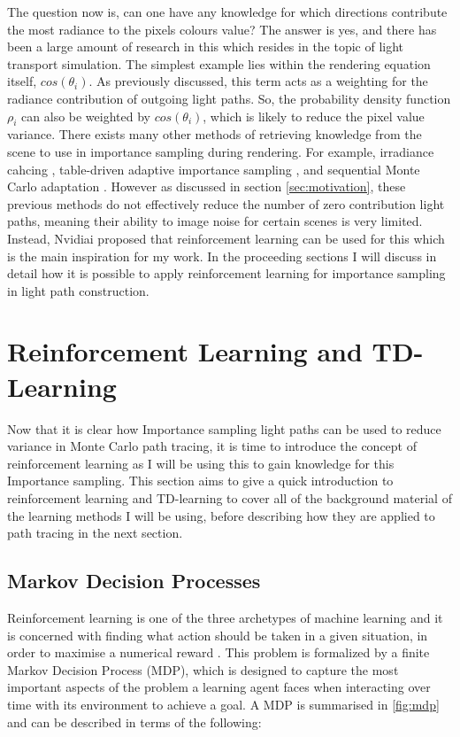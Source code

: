 \documentclass[ %
                    author={Callum Pearce},
                supervisor={Dr. Neill Campbell},
                    degree={MEng},
                     title={How effective are Temporal difference learning methods for reducing the number of zero contribution light paths, while still accurately approximating Global Illumination in Path tracing?},
                  subtitle={},
                      type={research},
                      year={2019} ]{dissertation}
\begin{document}
The question now is, can one have any knowledge for which directions contribute the most radiance to the pixels colours value? The answer is yes, and there has been a large amount of research in this which resides in the topic of light transport simulation. The simplest example lies within the rendering equation itself, $cos(\theta_i)$. As previously discussed, this term acts as a weighting for the radiance contribution of outgoing light paths. So, the probability density function $\rho_i$ can also be weighted by $cos(\theta_i)$, which is likely to reduce the pixel value variance. There exists many other methods of retrieving knowledge from the scene to use in importance sampling during rendering. For example, irradiance cahcing \cite{bashford2012significance}, table-driven adaptive importance sampling \cite{cline2008table}, and sequential Monte Carlo adaptation \cite{pegoraro2008towards}. However as discussed in section \ref{sec:motivation}, these previous methods do not effectively reduce the number of zero contribution light paths, meaning their ability to image noise for certain scenes is very limited. Instead, Nvidiai proposed that reinforcement learning can be used for this \cite{dahm2017learning} which is the main inspiration for my work. In the proceeding sections I will discuss in detail how it is possible to apply reinforcement learning for importance sampling in light path construction.

\section{Reinforcement Learning and TD-Learning}
Now that it is clear how Importance sampling light paths can be used to reduce variance in Monte Carlo path tracing, it is time to introduce the concept of reinforcement learning as I will be using this to gain knowledge for this Importance sampling. This section aims to give a quick introduction to reinforcement learning and TD-learning to cover all of the background material of the learning methods I will be using, before describing how they are applied to path tracing in the next section.

\subsection{Markov Decision Processes}
Reinforcement learning is one of the three archetypes of machine learning and it is concerned with finding what action should be taken in a given situation, in order to maximise a numerical reward \cite{sutton2011reinforcement}. This problem is formalized by a finite Markov Decision Process (MDP), which is designed to capture the most important aspects of the problem a learning agent faces when interacting over time with its environment to achieve a goal. A MDP is summarised in \ref{fig:mdp} and can be described in terms of the following:
\end{document}
